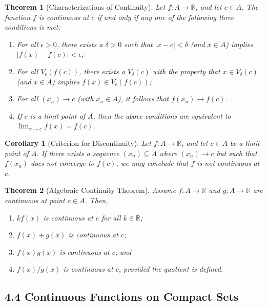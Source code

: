 \documentclass{amsart}
\newtheorem*{theorem}{Theorem}
\newtheorem*{corollary}{Corollary}
\theoremstyle{definition}
\newcommand{\R}{\mathbb{R}}
\newcommand{\abs}[1]{|#1|}
\begin{document}
\begin{theorem}[Characterizations of Continuity]
  Let $f : A \to \R$, and let $c \in A$. The function $f$ is continuous at $c$
  if and only if any one of the following three conditions is met:
  \begin{enumerate}[label={(\roman*)}]
    \item For all $\epsilon > 0$, there exists a $\delta > 0$ such that $\abs{x
      - c} < \delta$ (and $x \in A$) implies $\abs{f(x) - f(c)} < \epsilon$;
    \item For all $V_\epsilon(f(c))$, there exists a $V_\delta(c)$ with the
      property that $x \in V_\delta(c)$ (and $x \in A$) implies $f(x) \in
      V_\epsilon(f(c))$;
    \item For all $(x_n) \to c$ (with $x_n \in A$), it follows that $f(x_n) \to
      f(c)$.
    \item If $c$ is a limit point of $A$, then the above conditions are
      equivalent to $\lim_{x \to c} f(x) = f(c)$.
  \end{enumerate}
\end{theorem}

\begin{corollary}[Criterion for Discontinuity]
  Let $f : A \to \R$, and let $c \in A$ be a limit point of $A$. If there exists
  a sequence $(x_n) \subseteq A$ where $(x_n) \to c$ but such that $f(x_n)$ does
  not converge to $f(c)$, we may conclude that $f$ is not continuous at $c$.
\end{corollary}

\begin{theorem}[Algebraic Continuity Theorem]
  Assume $f : A \to \R$ and $g : A \to \R$ are continuous at point $c \in A$.
  Then,
  \begin{enumerate}[label={(\roman*)}]
    \item $k f(x)$ is continuous at $c$ for all $k \in \R$;
    \item $f(x) + g(x)$ is continuous at $c$;
    \item $f(x) g(x)$ is continuous at $c$; and
    \item $f(x) / g(x)$ is continuous at $c$, provided the quotient is defined.
  \end{enumerate}
\end{theorem}

\subsection*{4.4 Continuous Functions on Compact Sets}
\end{document}
